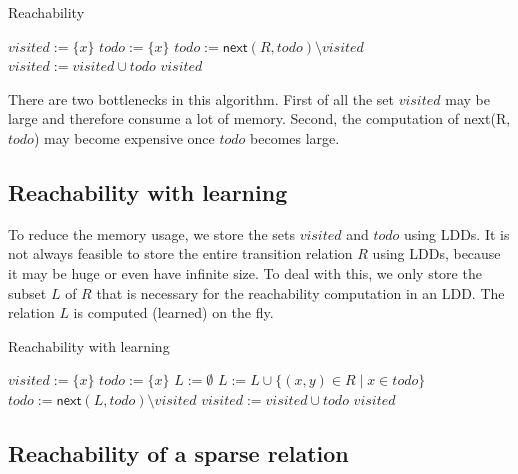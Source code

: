 \documentclass{article}
\newcommand{\var}[1]{\ensuremath{\textit{#1}}}
\begin{document}
\begin{algorithm}[ht]
\caption{Reachability}
\label{alg:reachability}
\begin{algorithmic}[1]
\State $\var{visited} := \{ x \}$
\State $\var{todo} := \{ x \}$
\While {$\var{todo} \neq \emptyset$}
    \State $\var{todo} := \textsf{next}(R, \var{todo}) \setminus \var{visited}$
    \State $\var{visited} := \var{visited} \cup \var{todo}$
\EndWhile
\State \Return \var{visited}
\EndFunction
\end{algorithmic}
\end{algorithm}

\noindent
There are two bottlenecks in this algorithm. First of all the set \var{visited} may be large and therefore consume a lot of memory. Second, the computation of \textsf{next}(R, \var{todo}) may become 
expensive once \var{todo} becomes large.

\subsection{Reachability with learning}
To reduce the memory usage, we store the sets $visited$ and $todo$ using LDDs. It is not always feasible to store the entire transition relation $R$ using LDDs, because it may be huge or even have infinite size. To deal with this, we only store the subset $L$ of $R$ that is necessary for the reachability computation in an LDD. The relation $L$ is computed (learned) on the fly.

\begin{algorithm}[ht]
\caption{Reachability with learning}
\label{alg:reachability}
\begin{algorithmic}[1]
\State $\var{visited} := \{ x \}$
\State $\var{todo} := \{ x \}$
\State $L := \emptyset$ 
\While {$\var{todo} \neq \emptyset$}
    \State $L := L \cup \{ (x,y) \in R \mid x \in \var{todo} \} $ 
    \State $\var{todo} := \textsf{next}(L, \var{todo}) \setminus \var{visited}$ 
    \State $\var{visited} := \var{visited} \cup \var{todo}$
\EndWhile
\State \Return \var{visited}
\EndFunction
\end{algorithmic}
\end{algorithm}

\newpage
\subsection{Reachability of a sparse relation}
\end{document}
